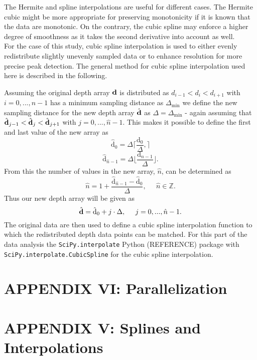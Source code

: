 \documentclass[../../CompleteThesis2/Complete_2ndDraft.tex]{subfiles}
\begin{document}
	The Hermite and spline interpolations are useful for different cases. The Hermite cubic might be more appropriate for preserving monotonicity if it is known that the data are monotonic. On the contrary, the cubic spline may enforce a higher degree of smoothness as it takes the second derivative into account as well.\\
	For the case of this study, cubic spline interpolation is used to either evenly redistribute slightly unevenly sampled data or to enhance resolution for more precise peak detection. The general method for cubic spline interpolation used here is described in the following.
	
	Assuming the original depth array $\text{\textbf{d}}$ is distributed as $d_{i-1} < d_i < d_{i+1}$ with $i = 0, ..., n-1$ has a minimum sampling distance as $\Delta_{\text{min}}$ we define the new sampling distance for the new depth array $\hat{\text{\textbf{d}}}$ as $\Delta =\Delta_{\text{min}}$ - again assuming that $\hat{\text{\textbf{d}}}_{j-1} < \hat{\text{\textbf{d}}}_j < \hat{\text{\textbf{d}}}_{j+1}$ with $j = 0, ..., \hat{n}-1$. This makes it possible to define the first and last value of the new array as
	\begin{equation}
		\hat{\text{d}}_0 = \Delta \lceil \frac{\text{d}_0}{\Delta}, \rceil 
		\label{Eq:InterpDepthMin}
	\end{equation}
	\begin{equation}
		\hat{\text{d}}_{\hat{n}-1} = \Delta \lfloor \frac{\text{d}_{n-1}}{\Delta} \rfloor.
		\label{Eq:InterpDepthMax}
	\end{equation}
	From this the number of values in the new array, $\hat{n}$, can be determined as
	\begin{equation}
		\hat{n} = 1 +  \frac{\hat{\text{d}}_{\hat{n}-1} - \hat{\text{d}}_0}{\Delta},\;\;\;\;\; \hat{n} \in\mathbb{Z}.
	\end{equation}
	Thus our new depth array will be given as
	\begin{equation}
		\hat{\text{\textbf{d}}} = \hat{\text{d}}_0 + j\cdot\Delta,\;\;\;\;\; j = 0, ..., \hat{n}-1.
	\end{equation}
	The original data are then used to define a cubic spline interpolation function to which the redistributed depth data points can be matched. For this part of the data analysis the \lstinline[columns=fixed]|SciPy.interpolate| Python (REFERENCE) package with \lstinline[columns=fixed]|SciPy.interpolate.CubicSpline| for the cubic spline interpolation.
	
	
	\newpage
	\section[Appendix VI]{APPENDIX VI: Parallelization}	
	\label{AppVI:Parallelization}
		
		
	\newpage
\section[Appendix V]{APPENDIX V: Splines and Interpolations}
\label{AppV:SplinesAndInterpolation}
\end{document}
